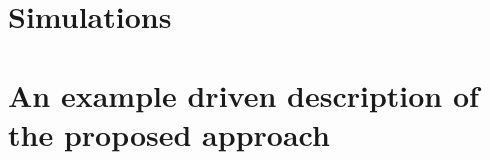 \documentclass{sig-alternate-ipsn13}
\begin{document}
%


\section{Simulations}
\label{sec:simulation}

\section{An example driven description of the proposed approach}
\end{document}
